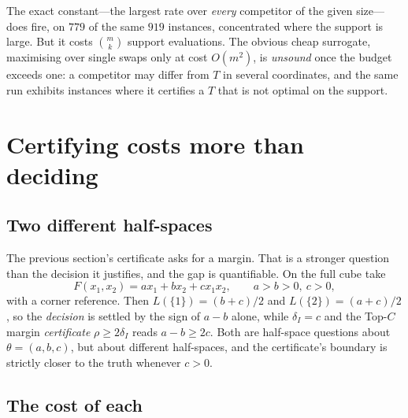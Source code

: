 The exact constant---the largest rate over \emph{every} competitor of the given size---does
fire, on $779$ of the same $919$ instances, concentrated where the support is large. But it
costs $\binom{m}{k}$ support evaluations. The obvious cheap surrogate, maximising over
single swaps only at cost $O(m^{2})$, is \emph{unsound} once the budget exceeds one: a
competitor may differ from $T$ in several coordinates, and the same run exhibits instances
where it certifies a $T$ that is not optimal on the support. \NUM{}


\section{Certifying costs more than deciding}
\label{sec:oracle}

\subsection{Two different half-spaces}

The previous section's certificate asks for a margin. That is a stronger question than the
decision it justifies, and the gap is quantifiable. On the full cube take
\begin{equation}
F(x_{1},x_{2})=ax_{1}+bx_{2}+cx_{1}x_{2},\qquad a>b>0,\ c>0 ,
\label{eq:abc}
\end{equation}
with a corner reference. Then $L(\{1\})=(b+c)/2$ and $L(\{2\})=(a+c)/2$, so the
\emph{decision} is settled by the sign of $a-b$ alone, while $\delta_{I}=c$ and the Top-$C$
margin \emph{certificate} $\rho\ge2\delta_{I}$ reads $a-b\ge2c$. Both are half-space
questions about $\theta=(a,b,c)$, but about different half-spaces, and the certificate's
boundary is strictly closer to the truth whenever $c>0$.

\subsection{The cost of each}

